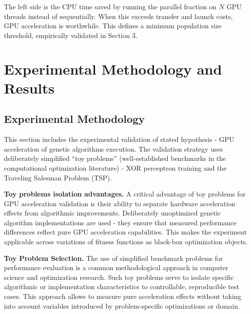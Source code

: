 The left side is the CPU time saved by running the parallel fraction on $N$ GPU threads instead of sequentially. When this exceeds transfer and launch costs, GPU acceleration is worthwhile. This defines a minimum population size threshold, empirically validated in Section 3.


\newpage
\section{Experimental Methodology and Results}

\subsection{Experimental Methodology}




This section includes the experimental validation of stated hypothesis - GPU acceleration of genetic algorithms execution. The validation strategy uses deliberately simplified ``toy problems'' (well-established benchmarks in the computational optimization literature) - XOR perceptron training and the Traveling Salesman Problem (TSP).

\textbf{Toy problems isolation advantages.} A critical advantage of toy problems for GPU acceleration validation is their ability to separate hardware acceleration effects from algorithmic improvements. Deliberately unoptimized genetic algorithm implementations are used - they ensure that measured performance differences reflect pure GPU acceleration capabilities. This makes the experiment applicable across variations of fitness functions as black-box optimization objects.

\textbf{Toy Problem Selection.} The use of simplified benchmark problems for performance evaluation is a common methodological approach in computer science and optimization research. Such toy problems serve to isolate specific algorithmic or implementation characteristics to controllable, reproducible test cases. This approach allows to measure pure acceleration effects without taking into account variables introduced by problem-specific optimizations or domain.

